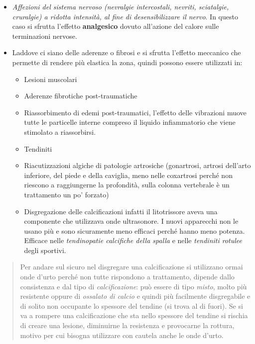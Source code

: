 \documentclass[]{article}
\begin{document}
\begin{itemize}
\item
  \emph{Affezioni del sistema nervoso (nevralgie intercostali, nevriti,
  sciatalgie, cruralgie) a ridotta intensità, al fine di
  desensibilizzare il nervo}. In questo caso si sfrutta l'effetto
  \textbf{analgesico} dovuto all'azione del calore sulle terminazioni
  nervose.
\item
  Laddove ci siano delle aderenze o fibrosi e si sfrutta l'effetto
  meccanico che permette di rendere più elastica la zona, quindi possono
  essere utilizzati in:

  \begin{itemize}
  \item
    Lesioni muscolari
  \item
    Aderenze fibrotiche post-traumatiche
  \item
    Riassorbimento di edemi post-traumatici, l'effetto delle vibrazioni
    muove tutte le particelle interne compreso il liquido infiammatorio
    che viene stimolato a riassorbirsi.
  \item
    Tendiniti
  \item
    Riacutizzazioni algiche di patologie artrosiche (gonartrosi, artrosi
    dell'arto inferiore, del piede e della caviglia, meno nelle
    coxartrosi perché non riescono a raggiungerne la profondità, sulla
    colonna vertebrale è un trattamento un po' forzato)
  \item
    Disgregazione delle calcificazioni infatti il litotrissore aveva una
    componente che utilizzava onde ultrasonore. I nuovi apparecchi non
    le usano più e sono sicuramente meno efficaci perché hanno meno
    potenza. Efficace nelle \emph{tendinopatie calcifiche della spalla}
    e nelle \emph{tendiniti rotulee} degli sportivi.
  \end{itemize}
\end{itemize}

\begin{quote}
Per andare sul sicuro nel disgregare una calcificazione si utilizzano
ormai onde d'urto perché non tutte rispondono a trattamento, dipende
dallo consistenza e dal tipo di \emph{calcificazione}: può essere di
tipo \emph{misto}, molto più resistente oppure di \emph{ossalato di
calcio} e quindi più facilmente disgregabile e di solito non occupante
lo spessore del tendine (si trova al di fuori). Se si va a rompere una
calcificazione che sta nello spessore del tendine si rischia di creare
una lesione, diminuirne la resistenza e provocarne la rottura, motivo
per cui bisogna utilizzare con cautela anche le onde d'urto.
\end{quote}
\end{document}
